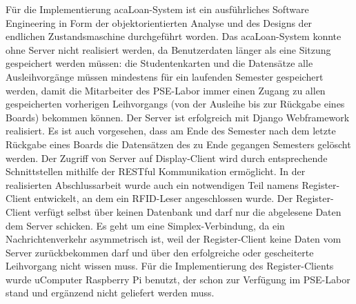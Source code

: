 Für die Implementierung acaLoan-System ist ein ausführliches Software Engineering in Form der objektorientierten Analyse und des Designs der endlichen Zustandsmaschine durchgeführt worden. Das acaLoan-System konnte ohne Server nicht realisiert werden, da Benutzerdaten länger als eine Sitzung gespeichert werden müssen: die Studentenkarten und die Datensätze alle Ausleihvorgänge müssen mindestens für ein laufenden Semester gespeichert werden, damit die Mitarbeiter des PSE-Labor immer einen Zugang zu allen gespeicherten vorherigen Leihvorgangs (von der Ausleihe bis zur Rückgabe eines Boards) bekommen können. Der Server ist erfolgreich mit Django Webframework realisiert. Es ist auch vorgesehen, dass am Ende des Semester nach dem letzte Rückgabe eines Boards die Datensätzen des zu Ende gegangen Semesters gelöscht werden. Der Zugriff von Server auf Display-Client wird durch entsprechende Schnittstellen mithilfe der RESTful Kommunikation ermöglicht. In der realisierten Abschlussarbeit wurde auch ein notwendigen Teil namens Register-Client entwickelt, an dem ein RFID-Leser angeschlossen wurde. Der Register-Client verfügt selbst über keinen Datenbank und darf nur die abgelesene Daten dem Server schicken. Es geht um eine Simplex-Verbindung, da ein Nachrichtenverkehr asymmetrisch ist, weil der Register-Client keine Daten vom Server zurückbekommen darf und über den erfolgreiche oder gescheiterte Leihvorgang nicht wissen muss. Für die Implementierung des Register-Clients wurde uComputer Raspberry Pi benutzt, der schon zur Verfügung im PSE-Labor stand und ergänzend nicht geliefert werden muss. 